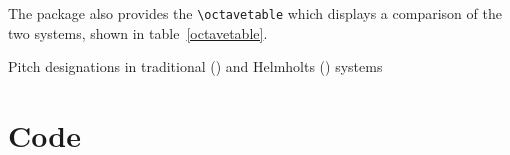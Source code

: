 \documentclass{article}
\begin{document}
The package also provides the \verb|\octavetable| which displays a comparison
of the two systems, shown in table~\ref{octavetable}.

\begin{table}
    \caption{Pitch designations in traditional () and Helmholts
    () systems}
    \label{octavetable}
    \begin{center}
    \octavetable
    \end{center}
\end{table}

\section{Code}

\end{document}
